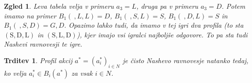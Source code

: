 \documentclass[10pt, a4paper]{article}
\newtheorem{trditev}[izr]{Trditev}
\newtheorem{zgled}[izr]{Zgled}
\begin{document}
\begin{zgled}
  

  Leva tabela velja v primeru $a_3 = L$, druga pa v primeru $a_3 = D$.
  Potem imamo na primer $B_1 (\ ,L, L) = D$, $B_1 (\ , S, L) = S$, $B_1 (\ , D, L) = S$ in $B_1 (\ , S, D) = G, D$.
  Opazimo lahko tudi, da imamo v tej igri dva profila (to sta $(\textrm{S}, \textrm{D}, \textrm{L})$ in $(\textrm{S}, \textrm{L}, \textrm{D})$),
  kjer imajo vsi igralci najboljše odgovore. To pa sta tudi Nashevi ravnovesji te igre.
\end{zgled}

\begin{trditev}
  Profil akcij $a^* = (a_i^*)_{i \in N}$ je čisto Nashevo ravnovesje natanko tedaj,
  ko velja $a_i^* \in B_i (a^*)$ za vsak $i \in N$.
\end{trditev}
\end{document}
